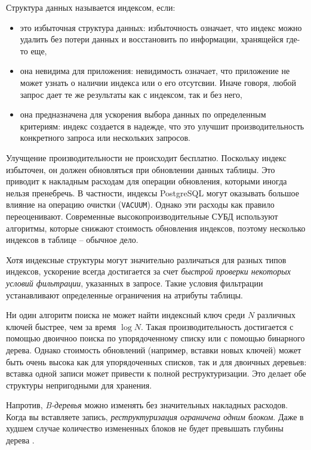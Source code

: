 \documentclass[%
	11pt,
	a4paper,
	utf8,
		]{article}
\begin{document}

Структура данных называется индексом, если:
\begin{itemize}
	\item это избыточная структура данных: избыточность означает, что индекс можно удалить без потери данных и восстановить по информации, хранящейся где-то еще,
	
	\item она невидима для приложения: невидимость означает, что приложение не может узнать о наличии индекса или о его отсутсвии. Иначе говоря, любой запрос дает те же результаты как с индексом, так и без него,
	
	\item она предназначена для ускорения выбора данных по определенным критериям: индекс создается в надежде, что это улучшит производительность конкретного запроса или нескольких запросов.
\end{itemize}

Улучщение производительности не происходит бесплатно. Поскольку индекс избыточен, он должен обновляться при обновлении данных таблицы. Это приводит к накладным расходам для операции обновления, которыми иногда нельзя пренебречь. В частности, индексы PostgreSQL могут оказывать большое влияние на операцию очистки (\verb|VACUUM|). Однако эти расходы как правило переоценивают. Современные высокопроизводительные СУБД используют алгоритмы, которые снижают стоимость обновления индексов, поэтому несколько индексов в таблице -- обычное дело.

Хотя индексные структуры могут значительно различаться для разных типов индексов, ускорение всегда достигается за счет \emph{быстрой проверки некоторых условий фильтрации}, указанных в запросе. Такие условия фильтрации устанавливают определенные ограничения на атрибуты таблицы.

Ни один алгоритм поиска не может найти индексный ключ среди $ N $ различных ключей быстрее, чем за время $ \log N $. Такая производительность достигается с помощью двоичноо поиска по упорядоченному списку или с помощью бинарного дерева. Однако стоимость обновлений (например, вставки новых ключей) может быть очень высока как для упорядоченных списков, так и для двоичных деревьев: вставка одной записи может привести к полной реструктуризации. Это делает обе структуры непригодными для хранения.

Напротив, \emph{B-деревья} можно изменять без значительных накладных расходов. Когда вы вставляете запись, \emph{реструктуризация ограничена одним блоком}. Даже в худшем случае количество измененных блоков не будет превышать глубины дерева \cite[]{dombrovskaya:postgresql-2022}.
\end{document}
